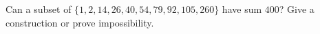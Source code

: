 Can a subset of $\{1,2,14,26,40,54,79,92,105,260\}$ have sum $400$? Give a construction or prove impossibility.

